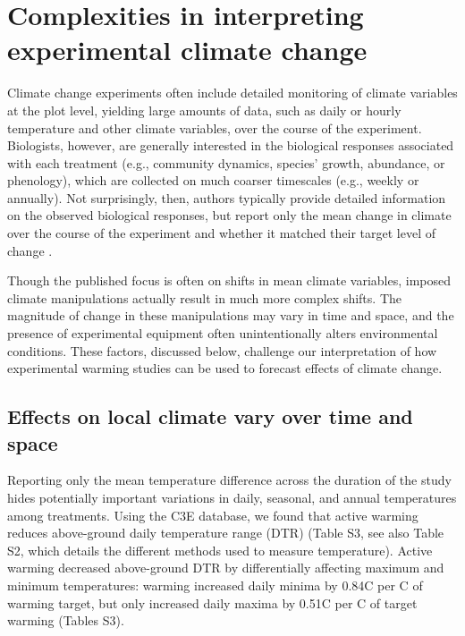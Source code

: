 \documentclass{article}
\begin{document}
\section* {Complexities in interpreting experimental climate change} 

Climate change experiments often include detailed monitoring of climate variables at the plot level, yielding large amounts of data, such as daily or hourly temperature and other climate variables, over the course of the experiment. Biologists, however, are generally interested in the biological responses associated with each treatment (e.g., community dynamics, species' growth, abundance, or phenology), which are collected on much coarser timescales (e.g., weekly or annually). Not surprisingly, then, authors typically provide detailed information on the observed biological responses, but report only the mean change in climate over the course of the experiment and whether it matched their target level of change \citep[e.g.,][]{price1998,clark2014a,clark2014b,rollinson2012}. 

\par Though the published focus is often on shifts in mean climate variables, imposed climate manipulations actually result in much more complex shifts. The magnitude of change in these manipulations may vary in time and space, and the presence of experimental equipment often unintentionally alters environmental conditions. These factors, discussed below, challenge our interpretation of how experimental warming studies can be used to forecast effects of climate change.

\subsection* {Effects on local climate vary over time and space}
Reporting only the mean temperature difference across the duration of the study hides potentially important variations in daily, seasonal, and annual temperatures among treatments. Using the C3E database, we found that active warming reduces above-ground daily temperature range (DTR) (Table S3, see also Table S2, which details the different methods used to measure temperature). Active warming decreased above-ground DTR by differentially affecting maximum and minimum temperatures: warming increased daily minima by 0.84\degree C per \degree C of warming target, but only increased daily maxima by 0.51\degree C per \degree C of target warming (Tables S3). %
\end{document}
